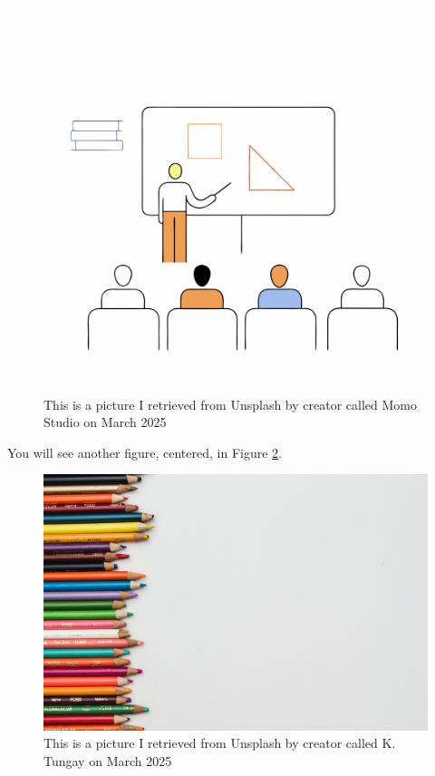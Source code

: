 \documentclass{article}
\begin{document}
\begin{figure}[H]
\centering
\captionsetup{width=.5\linewidth}
\includegraphics[scale=0.03]{momo.png}
\caption{This is a picture I retrieved from Unsplash by creator called Momo Studio \cite{momo} on March 2025}
\label{man}
\end{figure}

You will see another figure, centered, in Figure \ref{tungay}.

\begin{figure}
\centering
\captionsetup{width=.5\linewidth}
\includegraphics[scale=0.03]{tungay.jpg}
\caption{This is a picture I retrieved from Unsplash by creator called K. Tungay \cite{t25} on March 2025}
\label{tungay}
\end{figure}
\end{document}
